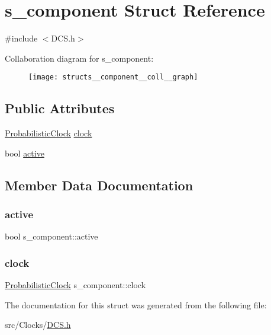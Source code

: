 \hypertarget{structs__component}{}\section{s\+\_\+component Struct Reference}
\label{structs__component}


{\ttfamily \#include $<$D\+C\+S.\+h$>$}



Collaboration diagram for s\+\_\+component\+:\nopagebreak
\begin{figure}[H]
\begin{center}
\leavevmode
\texttt{[image: structs\_\_component\_\_coll\_\_graph]}
\end{center}
\end{figure}
\subsection*{Public Attributes}
\begin{DoxyCompactItemize}
\item 
\hyperlink{class_probabilistic_clock}{Probabilistic\+Clock} \hyperlink{structs__component_a04be4e47e632b250bae7270fb70852e5}{clock}
\item 
bool \hyperlink{structs__component_a1ecdd5d1eed4c897ad2ae8b4e137e58a}{active}
\end{DoxyCompactItemize}


\subsection{Member Data Documentation}
\mbox{\label{structs__component_a1ecdd5d1eed4c897ad2ae8b4e137e58a}} 
\subsubsection{\texorpdfstring{active}{active}}
{\footnotesize\ttfamily bool s\+\_\+component\+::active}

\mbox{\label{structs__component_a04be4e47e632b250bae7270fb70852e5}} 
\subsubsection{\texorpdfstring{clock}{clock}}
{\footnotesize\ttfamily \hyperlink{class_probabilistic_clock}{Probabilistic\+Clock} s\+\_\+component\+::clock}



The documentation for this struct was generated from the following file\+:\begin{DoxyCompactItemize}
\item 
src/\+Clocks/\hyperlink{_d_c_s_8h}{D\+C\+S.\+h}\end{DoxyCompactItemize}
